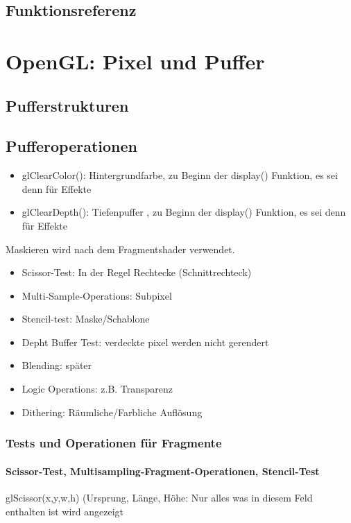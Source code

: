 \section{Funktionsreferenz}

\chapter{OpenGL: Pixel und Puffer}
\section{Pufferstrukturen}
\section{Pufferoperationen}
\begin{itemize}
\item glClearColor(): Hintergrundfarbe, zu Beginn der display() Funktion, es sei denn für Effekte
\item glClearDepth(): Tiefenpuffer , zu Beginn der display() Funktion, es sei denn für Effekte
\end{itemize}
Maskieren wird nach dem Fragmentshader verwendet.
\begin{itemize}
\item Scissor-Test: In der Regel Rechtecke (Schnittrechteck)
\item Multi-Sample-Operations: Subpixel
\item Stencil-test: Maske/Schablone
\item Depht Buffer Test: verdeckte pixel werden nicht gerendert
\item Blending: später
\item Logic Operations: z.B. Transparenz
\item Dithering: Räumliche/Farbliche Auflösung
\end{itemize}
\subsection{Tests und Operationen für Fragmente}
\subsubsection{Scissor-Test, Multisampling-Fragment-Operationen, Stencil-Test}
glScissor(x,y,w,h) (Ursprung, Länge, Höhe: Nur alles was in diesem Feld enthalten ist wird angezeigt
